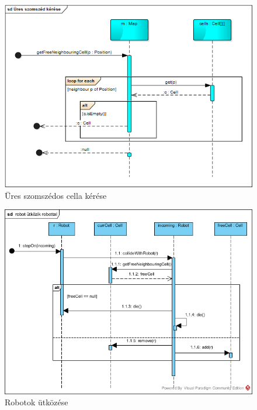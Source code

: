 \begin{figure}[!htbp]
	\begin{center}
		\includegraphics[width=166mm, center]{./vegleges_statikus_seq/get_free_cell.png}
		\caption{Üres szomszédos cella kérése}
	\end{center}
\end{figure}

\begin{figure}[!htbp]
	\begin{center}
		\includegraphics[width=166mm, center]{./vegleges_statikus_seq/robot_collide_robot.png}
		\caption{Robotok ütközése}
	\end{center}
\end{figure}

